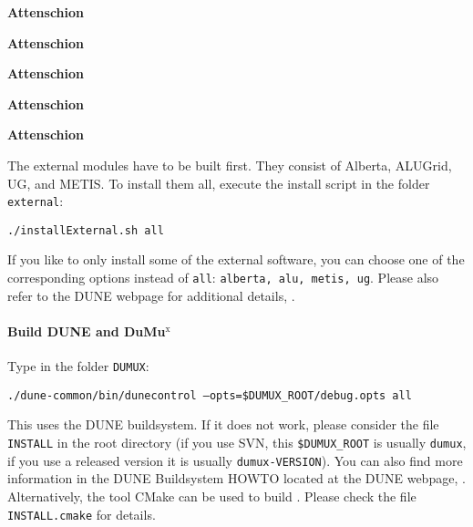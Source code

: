 \begin{turn}{45}\textbf{Attenschion}\end{turn}
\begin{turn}{45}\textbf{Attenschion}\end{turn}
\begin{turn}{45}\textbf{Attenschion}\end{turn}
\begin{turn}{45}\textbf{Attenschion}\end{turn}
\begin{turn}{45}\textbf{Attenschion}\end{turn}

The external modules have to be built first. They consist of Alberta, ALUGrid, UG, and METIS.
To install them all, execute the install script in the folder \texttt{external}:
\begin{center}
\texttt{./installExternal.sh all}
\end{center}
If you like to only install some of the external software, you can choose one of the 
corresponding options instead of \texttt{all}: \texttt{alberta, alu, metis, ug}.
Please also refer to the DUNE webpage for additional details, \cite{DUNE-HP}. 

\paragraph{Build DUNE and DuMu$^\text{x}$}
\label{buildIt}
Type in the folder \texttt{DUMUX}: 
\begin{center}
\texttt{./dune-common/bin/dunecontrol --opts=\$DUMUX\_ROOT/debug.opts all}
\end{center}
This uses the DUNE buildsystem. If it does not work, please consider
the file \texttt{INSTALL} in the \Dumux root directory (if you use
SVN, this \texttt{\$DUMUX\_ROOT} is usually \texttt{dumux}, if you use
a released version it is usually \texttt{dumux-VERSION}). You can also
find more information in the DUNE Buildsystem HOWTO located at the
DUNE webpage, \cite{DUNE-HP}.  Alternatively, the tool CMake can be
used to build \Dumux. Please check the file \texttt{INSTALL.cmake} for
details.
